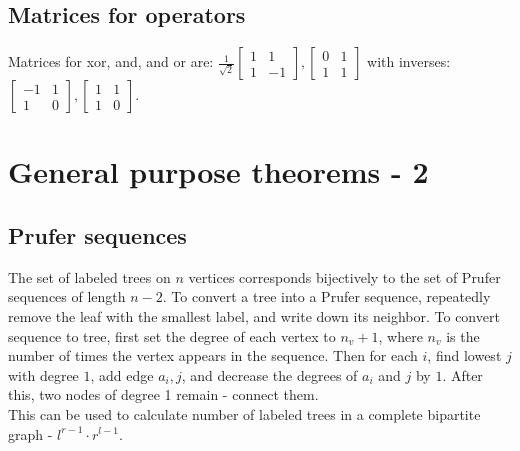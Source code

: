     \subsection{Matrices for operators}
    Matrices for xor, and, and or are: $\frac{1}{\sqrt{2}} \begin{bmatrix} 1 & 1 \\ 1 & -1\end{bmatrix}, \begin{bmatrix} 0 & 1 \\ 1 & 1\end{bmatrix}$
    with inverses: $\begin{bmatrix} -1 & 1 \\ 1 & 0\end{bmatrix}, \begin{bmatrix} 1 & 1 \\ 1 & 0\end{bmatrix}$.
    
 \section{General purpose theorems - 2}

    \subsection{Prufer sequences}
    The set of labeled trees on $n$ vertices corresponds bijectively to the set of Prufer sequences of length $n-2$.
    To convert a tree into a Prufer sequence, repeatedly remove the leaf with the smallest label, and write down its neighbor.
    To convert sequence to tree, first set the degree of each vertex to $n_v + 1$, where $n_v$ is the number of times
    the vertex appears in the sequence. Then for each $i$, find lowest $j$ with degree $1$, add edge $a_i, j$, and decrease
    the degrees of $a_i$ and $j$ by $1$. After this, two nodes of degree 1 remain - connect them.\\
    This can be used to calculate number of labeled trees in a complete bipartite graph - $l^{r-1}\cdot r^{l-1}$.

